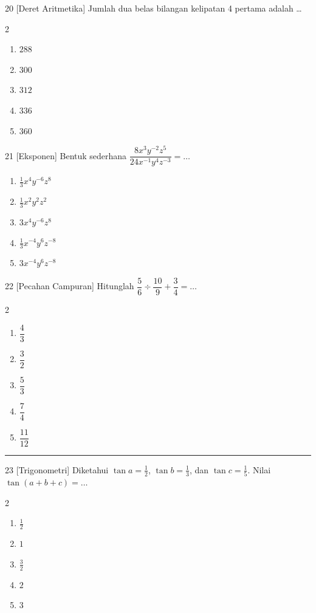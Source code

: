 \documentclass[11pt]{article}
\newenvironment{pil}{%
  \begin{enumerate}[label=(\alph*),leftmargin=*,itemsep=1pt,topsep=3pt]}%
  {\end{enumerate}}
\newenvironment{pilB}{%
  \par\smallskip\begin{multicols}{2}
  \begin{enumerate}[label=(\alph*),leftmargin=*,itemsep=1pt,topsep=3pt]}%
  {\end{enumerate}\end{multicols}}
\begin{document}
\begin{soal}{20 \normalfont\small[Deret Aritmetika]}
Jumlah dua belas bilangan kelipatan 4 pertama adalah \ldots
\begin{pilB}
  \item $288$ \item $300$ \item $312$ \item $336$ \item $360$
\end{pilB}
\end{soal}

\begin{soal}{21 \normalfont\small[Eksponen]}
Bentuk sederhana $\dfrac{8x^3y^{-2}z^5}{24x^{-1}y^4z^{-3}}=\ldots$
\begin{pil}
  \item $\tfrac13x^4y^{-6}z^8$ \item $\tfrac13x^2y^2z^2$
  \item $3x^4y^{-6}z^8$ \item $\tfrac13x^{-4}y^6z^{-8}$ \item $3x^{-4}y^6z^{-8}$
\end{pil}
\end{soal}

\begin{soal}{22 \normalfont\small[Pecahan Campuran]}
Hitunglah $\dfrac56\div\dfrac{10}{9}+\dfrac34=\ldots$
\begin{pilB}
  \item $\dfrac43$ \item $\dfrac32$ \item $\dfrac53$ \item $\dfrac74$ \item $\dfrac{11}{12}$
\end{pilB}
\end{soal}


\smallskip\hrule\medskip

\begin{soal}{23 \normalfont\small[Trigonometri]}
Diketahui $\tan a=\tfrac12$, $\tan b=\tfrac13$, dan $\tan c=\tfrac15$.
Nilai $\tan(a+b+c)=\ldots$
\begin{pilB}
  \item $\tfrac12$ \item $1$ \item $\tfrac32$ \item $2$ \item $3$
\end{pilB}
\end{soal}
\end{document}
